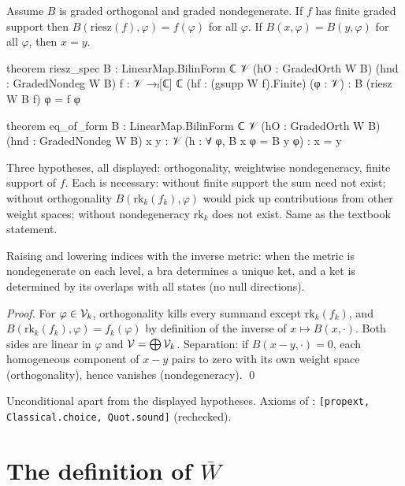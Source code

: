 \begin{theorem}\label{ch09:thm:riesz}
Assume $B$ is graded orthogonal and graded nondegenerate. If $f$ has finite graded support then
$B(\mathrm{riesz}(f),\varphi)=f(\varphi)$ for all $\varphi$. If $B(x,\varphi)=B(y,\varphi)$ for all
$\varphi$, then $x=y$.
\end{theorem}
\begin{leancode}
theorem riesz_spec {B : LinearMap.BilinForm ℂ 𝒱} (hO : GradedOrth W B) (hnd : GradedNondeg W B)
    {f : 𝒱 →ₗ[ℂ] ℂ} (hf : (gsupp W f).Finite) (φ : 𝒱) : B (riesz W B f) φ = f φ

theorem eq_of_form {B : LinearMap.BilinForm ℂ 𝒱} (hO : GradedOrth W B) (hnd : GradedNondeg W B)
    {x y : 𝒱} (h : ∀ φ, B x φ = B y φ) : x = y
\end{leancode}
\begin{dictionary}
Three hypotheses, all displayed: orthogonality, weightwise nondegeneracy, finite support of $f$.
Each is necessary: without finite support the sum need not exist; without orthogonality
$B(\mathrm{rk}_k(f_k),\varphi)$ would pick up contributions from other weight spaces; without
nondegeneracy $\mathrm{rk}_k$ does not exist. Same as the textbook statement.
\end{dictionary}
\begin{physics}
Raising and lowering indices with the inverse metric: when the metric is nondegenerate on each level, a bra determines a unique ket, and a ket is determined by its overlaps with all states (no null directions).
\end{physics}

\noindent\emph{Proof.} For $\varphi\in\mathcal{V}_k$, orthogonality kills every summand except
$\mathrm{rk}_k(f_k)$, and $B(\mathrm{rk}_k(f_k),\varphi)=f_k(\varphi)$ by definition of the inverse
of $x\mapsto B(x,\cdot)$. Both sides are linear in $\varphi$ and $\mathcal{V}=\bigoplus\mathcal{V}_k$.
Separation: if $B(x-y,\cdot)=0$, each homogeneous component of $x-y$ pairs to zero with its own
weight space (orthogonality), hence vanishes (nondegeneracy). \qed

\begin{status}
Unconditional apart from the displayed hypotheses. Axioms of :
\texttt{[propext, Classical.choice, Quot.sound]} (rechecked).
\end{status}

\section{The definition of \texorpdfstring{$\overline{W}$}{Wbar}}\label{ch09:sec:Wbar}

